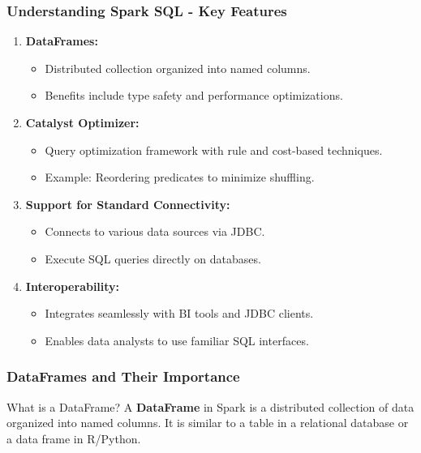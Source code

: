 \documentclass[aspectratio=169]{beamer}
\begin{document}
\begin{frame}[fragile]
    \frametitle{Understanding Spark SQL - Key Features}
    \begin{enumerate}
        \item \textbf{DataFrames:} 
            \begin{itemize}
                \item Distributed collection organized into named columns.
                \item Benefits include type safety and performance optimizations.
            \end{itemize}

        \item \textbf{Catalyst Optimizer:}
            \begin{itemize}
                \item Query optimization framework with rule and cost-based techniques.
                \item Example: Reordering predicates to minimize shuffling.
            \end{itemize}

        \item \textbf{Support for Standard Connectivity:}
            \begin{itemize}
                \item Connects to various data sources via JDBC.
                \item Execute SQL queries directly on databases.
            \end{itemize}

        \item \textbf{Interoperability:}
            \begin{itemize}
                \item Integrates seamlessly with BI tools and JDBC clients.
                \item Enables data analysts to use familiar SQL interfaces.
            \end{itemize}
    \end{enumerate}
\end{frame}

\begin{frame}[fragile]
    \frametitle{DataFrames and Their Importance}
    \begin{block}{What is a DataFrame?}
        A \textbf{DataFrame} in Spark is a distributed collection of data organized into named columns. 
        It is similar to a table in a relational database or a data frame in R/Python.
    \end{block}
\end{frame}
\end{document}
